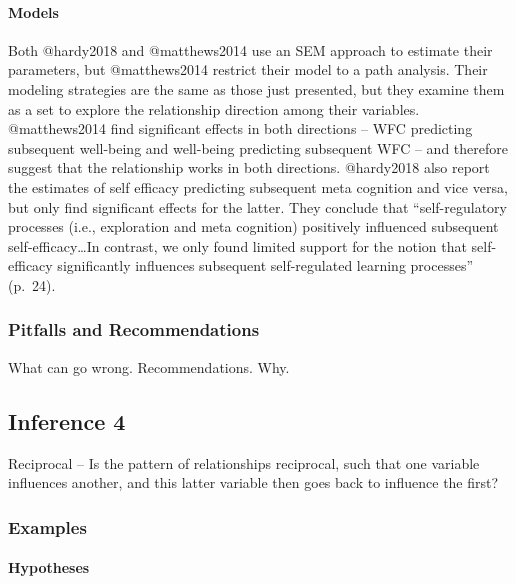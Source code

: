 \documentclass[]{article}
\let\oldparagraph\paragraph
\renewcommand{\paragraph}[1]{\oldparagraph{#1}\mbox{}}
\begin{document}
\hypertarget{models-9}{%
\paragraph{Models}\label{models-9}}

Both @hardy2018 and @matthews2014 use an SEM approach to estimate their
parameters, but @matthews2014 restrict their model to a path analysis.
Their modeling strategies are the same as those just presented, but they
examine them as a set to explore the relationship direction among their
variables. @matthews2014 find significant effects in both directions --
WFC predicting subsequent well-being and well-being predicting
subsequent WFC -- and therefore suggest that the relationship works in
both directions. @hardy2018 also report the estimates of self efficacy
predicting subsequent meta cognition and vice versa, but only find
significant effects for the latter. They conclude that ``self-regulatory
processes (i.e., exploration and meta cognition) positively influenced
subsequent self-efficacy\ldots{}In contrast, we only found limited
support for the notion that self-efficacy significantly influences
subsequent self-regulated learning processes'' (p.~24).

\hypertarget{pitfalls-and-recommendations-9}{%
\subsubsection{Pitfalls and
Recommendations}\label{pitfalls-and-recommendations-9}}

What can go wrong. Recommendations. Why.

\hypertarget{inference-4-1}{%
\subsection{Inference 4}\label{inference-4-1}}

Reciprocal -- Is the pattern of relationships reciprocal, such that one
variable influences another, and this latter variable then goes back to
influence the first?

\hypertarget{examples-10}{%
\subsubsection{Examples}\label{examples-10}}

\hypertarget{hypotheses-10}{%
\paragraph{Hypotheses}\label{hypotheses-10}}
\end{document}
